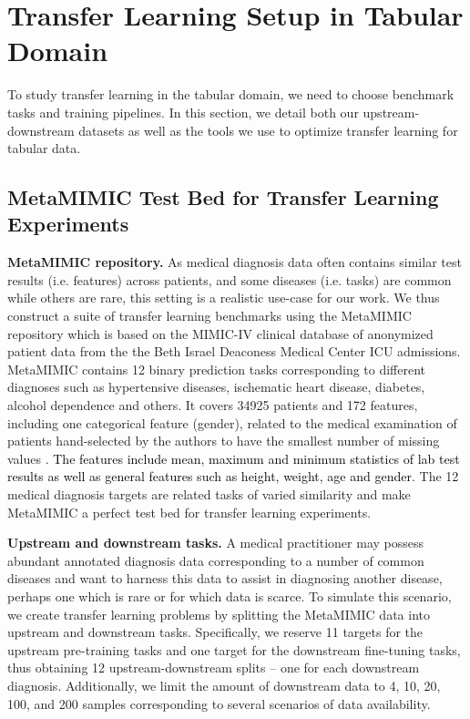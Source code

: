 \section{Transfer Learning Setup in Tabular Domain}
\label{sec:tl-setup}

To study transfer learning in the tabular domain, we need to choose benchmark tasks and training pipelines.  In this section, we detail both our upstream-downstream datasets as well as the tools we use to optimize transfer learning for tabular data.

\subsection{MetaMIMIC Test Bed for Transfer Learning Experiments}
\label{mimic-for-tl}

{\bf MetaMIMIC repository.} As medical diagnosis data often contains similar test results (i.e. features) across patients, and some diseases (i.e. tasks) are common while others are rare, this setting is a realistic use-case for our work.  We thus construct a suite of transfer learning benchmarks using the MetaMIMIC repository \cite{metaMIMIC_github, woznica2022consolidated} which is based on the MIMIC-IV \cite{mimiciv_v1, goldberger2000physiobank} clinical database of anonymized patient data from the the Beth Israel Deaconess Medical Center ICU admissions. MetaMIMIC contains 12 binary prediction tasks corresponding to different diagnoses such as hypertensive diseases, ischematic heart disease, diabetes, alcohol dependence and others. It covers 34925 patients and 172 features, including one categorical feature (gender), related to the medical examination of patients hand-selected by the authors to have the smallest number of missing values \citep{metaMIMIC_github, woznica2022consolidated}. \textcolor{black}{The features include mean, maximum and minimum statistics of lab test results as well as general features such as height, weight, age and gender}. The 12 medical diagnosis targets are related tasks of varied similarity and make MetaMIMIC a perfect test bed for transfer learning experiments.

{\bf Upstream and downstream tasks.} A medical practitioner may possess abundant annotated diagnosis data corresponding to a number of common diseases and want to harness this data to assist in diagnosing another disease, perhaps one which is rare or for which data is scarce. To simulate this scenario, we create transfer learning problems by splitting the MetaMIMIC data into upstream and downstream tasks. Specifically, we reserve 11 targets for the upstream pre-training tasks and one target for the downstream fine-tuning tasks, thus obtaining 12 upstream-downstream splits -- one for each downstream diagnosis. Additionally, we limit the amount of downstream data to 4, 10, 20, 100, and 200 samples corresponding to several scenarios of data availability. 

